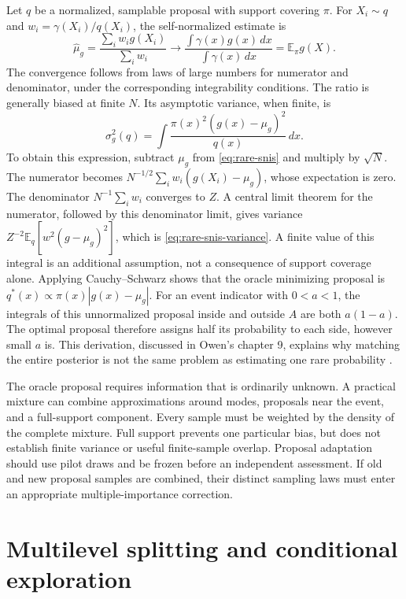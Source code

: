 Let $q$ be a normalized, samplable proposal with support covering $\pi$.
For $X_i\sim q$ and $w_i=\gamma(X_i)/q(X_i)$, the self-normalized estimate is
\begin{equation}
 \widehat\mu_g=\frac{\sum_iw_ig(X_i)}{\sum_iw_i}
 \longrightarrow\frac{\int\gamma(x)g(x)\,dx}{\int\gamma(x)\,dx}
 =\mathbb E_\pi g(X).
 \label{eq:rare-snis}
\end{equation}
The convergence follows from laws of large numbers for numerator and
denominator, under the corresponding integrability conditions. The ratio is
generally biased at finite $N$. Its asymptotic variance, when finite, is
\begin{equation}
 \sigma_g^2(q)=\int\frac{\pi(x)^2(g(x)-\mu_g)^2}{q(x)}\,dx.
 \label{eq:rare-snis-variance}
\end{equation}
To obtain this expression, subtract $\mu_g$ from
\eqref{eq:rare-snis} and multiply by $\sqrt N$. The numerator becomes
$N^{-1/2}\sum_iw_i(g(X_i)-\mu_g)$, whose expectation is zero. The
denominator $N^{-1}\sum_iw_i$ converges to $Z$. A central limit theorem
for the numerator, followed by this denominator limit, gives variance
$Z^{-2}\mathbb E_q[w^2(g-\mu_g)^2]$, which is
\eqref{eq:rare-snis-variance}. A finite value of this integral is an
additional assumption, not a consequence of support coverage alone.
Applying Cauchy--Schwarz shows that the oracle minimizing proposal is
$q^*(x)\propto\pi(x)|g(x)-\mu_g|$. For an event indicator with $0<a<1$, the integrals
of this unnormalized proposal inside and outside $A$ are both $a(1-a)$.
The optimal proposal therefore assigns half its probability to each side,
however small $a$ is. This derivation, discussed in Owen's chapter 9,
explains why matching the entire posterior is not the same problem as
estimating one rare probability \citep[section 9.2]{owen2013mc}.

The oracle proposal requires information that is ordinarily unknown. A
practical mixture can combine approximations around modes, proposals near the
event, and a full-support component. Every sample must be weighted by the
density of the complete mixture. Full support prevents one particular bias,
but does not establish finite variance or useful finite-sample overlap.
Proposal adaptation should use pilot draws and be frozen before an independent
assessment. If old and new proposal samples are combined, their distinct
sampling laws must enter an appropriate multiple-importance correction.

\section{Multilevel splitting and conditional exploration}

